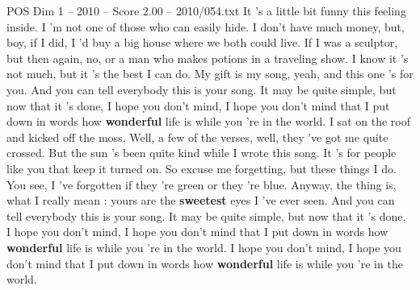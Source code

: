 \begin{textsample}{POS Dim 1 – 2010 – Score 2.00 – 2010/054.txt}  \label{ex:f1_pos_021}
It 's a little bit funny this feeling inside.
I 'm not one of those who can easily hide.
I don't have much money, but, boy, if I did, I 'd buy a big house where we both could live.
If I was a sculptor, but then again, no, or a man who makes potions in a traveling show.
I know it 's not much, but it 's the best I can do.
My gift is my song, yeah, and this one 's for you.
And you can tell everybody this is your song.
It may be quite simple, but now that it 's done, I hope you don't mind, I hope you don't mind that I put down in words how \textbf{wonderful} life is while you 're in the world.
I sat on the roof and kicked off the moss.
Well, a few of the verses, well, they 've got me quite crossed.
But the sun 's been quite kind while I wrote this song.
It 's for people like you that keep it turned on.
So excuse me forgetting, but these things I do.
You see, I 've forgotten if they 're green or they 're blue.
Anyway, the thing is, what I really mean : yours are the \textbf{sweetest} eyes I 've ever seen.
And you can tell everybody this is your song.
It may be quite simple, but now that it 's done, I hope you don't mind, I hope you don't mind that I put down in words how \textbf{wonderful} life is while you 're in the world.
I hope you don't mind, I hope you don't mind that I put down in words how \textbf{wonderful} life is while you 're in the world.

\end{textsample}
